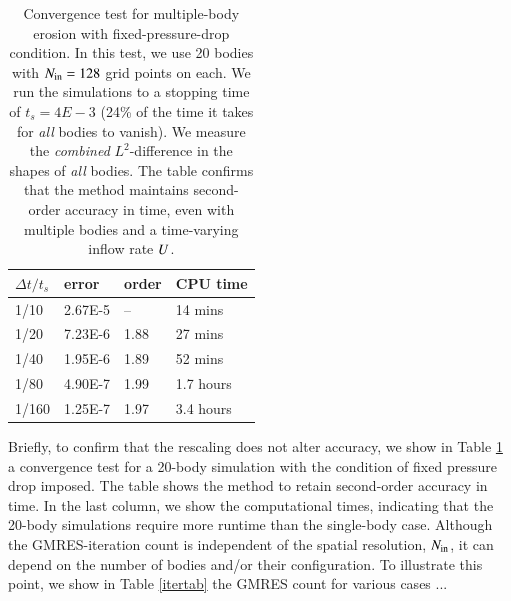 \documentclass[preprint, 10pt]{elsarticle}
\begin{document}
\begin{table}%
\begin{center}
\caption{Convergence test for multiple-body erosion with fixed-pressure-drop condition. In this test, we use 20 bodies with $N_{\mathrm{in}} = 128$ grid points on each. We run the simulations to a stopping time of $t_s = 4E-3$ (24\% of the time it takes for {\em all} bodies to vanish). We measure the {\em combined} $L^2$-difference in the shapes of {\em all} bodies. The table confirms that the method maintains second-order accuracy in time, even with multiple bodies and a time-varying inflow rate $U$.
}
\vspace{0.3 pc}
\label{convtab}
\begin{tabular}{l l l l}
\hline
\hspace{0.0pc} $\Delta t/t_s$
\hspace{0.5pc} & error 
\hspace{0.5pc} & order
\hspace{0.5pc} & CPU time \\
\hline
%
1/10     	& 2.67E-5  	& --        	& 14 mins  	\\
1/20     	& 7.23E-6  	& 1.88 	& 27 mins  	\\
1/40     	& 1.95E-6  	& 1.89 	& 52 mins  	\\
1/80     	& 4.90E-7  	& 1.99 	& 1.7 hours	\\
1/160     	& 1.25E-7  	& 1.97  	& 3.4 hours	\\
%
\hline
\end{tabular}
\end{center}
\end{table}

Briefly, to confirm that the rescaling does not alter accuracy, we show in Table \ref{convtab} a convergence test for a 20-body simulation with the condition of fixed pressure drop imposed. The table shows the method to retain second-order accuracy in time. In the last column, we show the computational times, indicating that the 20-body simulations require more runtime than the single-body case. Although the GMRES-iteration count is independent of the spatial resolution, $N_{\mathrm{in}}$, it can depend on the number of bodies and/or their configuration. To illustrate this point, we show in Table \ref{itertab} the GMRES count for various cases ...
\end{document}
